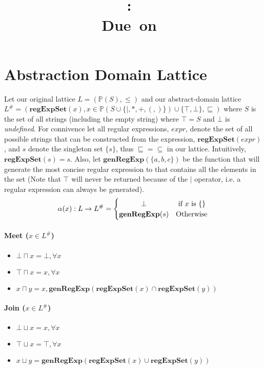 \documentclass{article}
\title{
\vspace{2in}
\textmd{\textbf{\hmwkClass:\ \hmwkTitle}}\\
\normalsize\vspace{0.1in}\small{Due\ on\ \hmwkDueDate}\\
\vspace{0.1in}\large{\textit{\hmwkClassInstructor}}
\vspace{3in}
}
\author{\textbf{\hmwkAuthorName}}
\date{} %
\newcommand{\powerset}[1]{\mathbb{P}(#1)}
\newcommand{\regExpSet}[1]{\mathbf{regExpSet}(#1)}
\newcommand{\genRegExp}[1]{\mathbf{genRegExp}(#1)}
\begin{document}
\maketitle
\newpage



\section{Abstraction Domain Lattice}
Let our original lattice $L = (\powerset{S}, \leq)$ and our abstract-domain lattice $L^\# = (\regExpSet{x}, x \in \powerset{S \cup \{|,*,+,(,)\} } \cup \{ \top,\bot \},\sqsubseteq)$ where $S$ is the set of all strings (including the empty string) where $\top = S$ and $\bot$ is \emph{undefined}. For connivence let all regular expressions, $expr$, denote the set of all possible strings that can be constructed from the expression, $\regExpSet{expr}$, and  $s$ denote the singleton set $\{s\}$, thus $\sqsubseteq = \subseteq$ in our lattice.  Intuitively, $\regExpSet{s} = s$.  Also, let $\genRegExp{\{a,b,c\}}$ be the function that will generate the most concise regular expression to that contains all the elements in the set (Note that $\top$ will never be returned because of the $|$ operator, i.e. a regular expression can always be generated).
\[
 \alpha(x): L \rightarrow L^\# =
  \begin{cases} 
      \hfill \bot    \hfill & \text{ if $x$ is \{\}} \\
      \hfill \genRegExp{s} \hfill & \text{Otherwise} \\
  \end{cases}
\]

\paragraph{Meet ($x \in L^\#$)}
\begin{itemize}
	\item $\bot \sqcap x = \bot, \forall x$
	\item $\top \sqcap x = x, \forall x$
	\item $x \sqcap y = x, \genRegExp{\regExpSet{x} \cap \regExpSet{y}}$
\end{itemize}
\paragraph{Join ($x \in L^\#$)}
\begin{itemize}
	\item $\bot \sqcup x = x, \forall x$
	\item $\top \sqcup x = \top, \forall x$
	\item $x \sqcup y = \genRegExp{\regExpSet{x} \cup \regExpSet{y}}$
\end{itemize}
\end{document}
